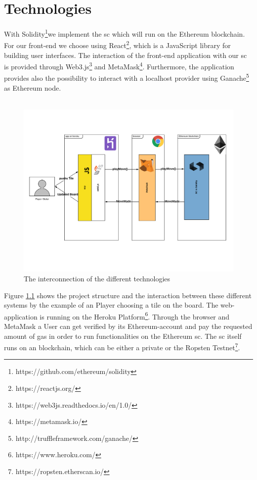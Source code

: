 \chapter{Technologies}\label{ch:technologies}
With Solidity\footnote{https://github.com/ethereum/solidity}we implement the \ac{sc} which will run on the Ethereum blockchain. For our front-end we choose using React\footnote{https://reactjs.org/}, which is a JavaScript library for building user interfaces. The interaction of the front-end application with our \ac{sc} is provided through Web3.js\footnote{https://web3js.readthedocs.io/en/1.0/} and MetaMask\footnote{https://metamask.io/}. Furthermore, the application provides also the possibility to interact with a localhost provider using Ganache\footnote{http://truffleframework.com/ganache/} as Ethereum node.\\\\
\begin{figure}[ht]
	\begin{center}
		\includegraphics[scale=0.4]{res/project_structure}
	\end{center}
	\caption{The interconnection of the different technologies}
	\label{fig:interconnection}
\end{figure}	
Figure \ref{fig:interconnection} shows the project structure and the interaction between these different systems by the example of an Player choosing a tile on the board.
The web-application is running on the Heroku Platform\footnote{https://www.heroku.com/}. Through the browser and MetaMask a User can get verified by its Ethereum-account and pay the requested amount of gas in order to run functionalities on the Ethereum \ac{sc}. The \ac{sc} itself runs on an blockchain, which can be either a private or the Ropsten Testnet\footnote{https://ropsten.etherscan.io/}.

